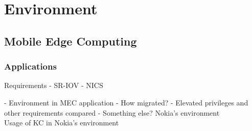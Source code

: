 \chapter{Environment}
\label{chapter:environment}

\section{Mobile Edge Computing}

\subsection{Applications}

Requirements
- SR-IOV
- NICS

- Environment in MEC application
    - How migrated?
    - Elevated privileges and other requirements compared
    - Something else?
Nokia's environment \\
Usage of KC in Nokia's environment \\








